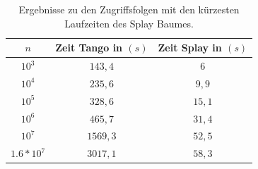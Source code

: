 \documentclass[a4paper,12pt]{article}
\begin{document}
\begin{table}[H]
	\begin{center}
		\begin{tabular}[c]{|c|c|c|}
			\hline
			$n$ & Zeit Tango in $\left(s\right)$ &Zeit Splay in $\left(s\right)$ \\
			\hline
			$10^3$ & $143,4$ &$6$ \\
			\hline
			$10^4$  & $235,6$ &$9,9$  \\
			\hline
			$10^5$  & $328,6$ &$15,1$  \\
			\hline
			$10^6$  & $465,7$ &$31,4$  \\
			\hline
			$10^7$  & $1569,3$ &$52,5$  \\
			\hline
			$1.6 * 10^7$  & $3017,1$ &$58,3$  \\
			\hline
		\end{tabular}
		\caption{Ergebnisse zu den Zugriffsfolgen mit den kürzesten Laufzeiten des Splay Baumes.} 
	\end{center}
\end{table}
\end{document}
